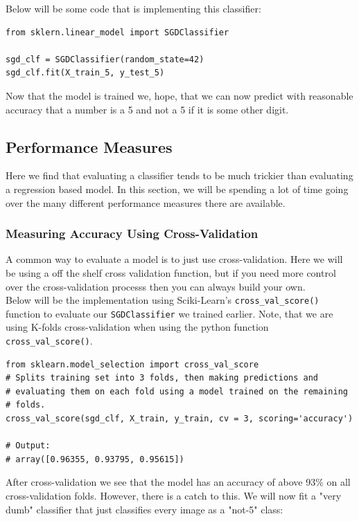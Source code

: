 \noindent
Below will be some code that is implementing this classifier:

\begin{verbatim}
from sklern.linear_model import SGDClassifier

sgd_clf = SGDClassifier(random_state=42)
sgd_clf.fit(X_train_5, y_test_5)    
\end{verbatim}

\noindent
Now that the model is trained we, hope, that we can now predict with reasonable accuracy that a 
number is a 5 and not a 5 if it is some other digit.

\subsection{Performance Measures}

Here we find that evaluating a classifier tends to be much trickier than evaluating a regression based
model. In this section, we will be spending a lot of time going over the many different performance
measures there are available. 

\subsubsection{Measuring Accuracy Using Cross-Validation}

A common way to evaluate a model is to just use cross-validation. Here we will be using a off the shelf
cross validation function, but if you need more control over the cross-validation processs then you 
can always build your own. \\

\noindent
Below will be the implementation using Sciki-Learn's \texttt{cross_val_score()} function
to evaluate our \texttt{SGDClassifier} we trained earlier. Note, that we are using K-folds
cross-validation when using the python function \texttt{cross_val_score()}.

\begin{verbatim}
from sklearn.model_selection import cross_val_score
# Splits training set into 3 folds, then making predictions and 
# evaluating them on each fold using a model trained on the remaining
# folds.
cross_val_score(sgd_clf, X_train, y_train, cv = 3, scoring='accuracy')

# Output:
# array([0.96355, 0.93795, 0.95615])
\end{verbatim}

\noindent
After cross-validation we see that the model has an accuracy of above 93\% on all cross-validation 
folds. However, there is a catch to this. We will now fit a "very dumb" classifier that just 
classifies every image as a "not-5" class:


